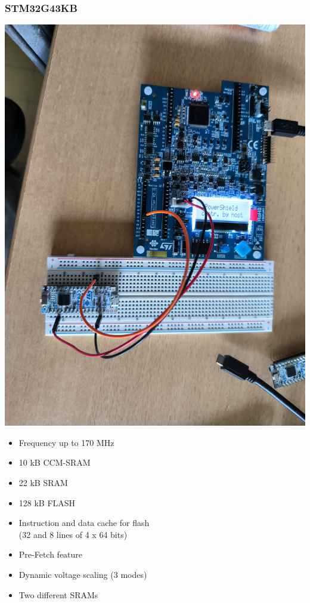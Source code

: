 \documentclass[
	11pt, %
]{beamer}
\begin{document}
\begin{frame}
    \frametitle{STM32G43KB}
	\centering
    \begin{minipage}{0.4\textwidth}
		\includegraphics[scale = 0.04]{images/stm32g.jpg}
	\end{minipage}
	\begin{minipage}{0.50\textwidth}
		\centering
		\begin{itemize}
			\item Frequency up to 170 MHz 
			\item 10 kB CCM-SRAM
			\item 22 kB SRAM 
			\item 128 kB FLASH
			\item Instruction and data cache for flash \\ (32 and 8 lines of 4 x 64 bits) 
			\item Pre-Fetch feature
			\item Dynamic voltage scaling (3 modes)
			\item Two different SRAMs
		\end{itemize}
		\end{minipage}
\end{frame}
\end{document}
